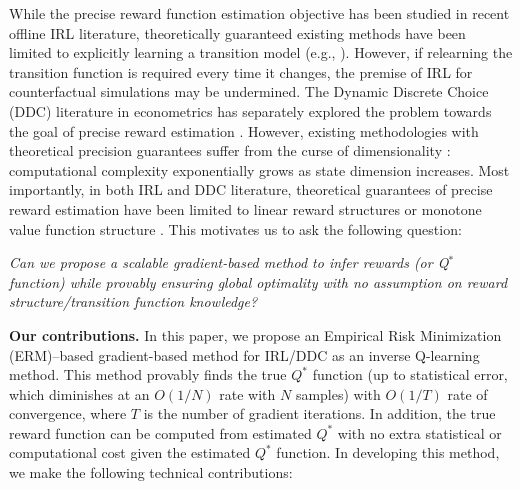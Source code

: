 While the precise reward function estimation objective has been studied in recent offline IRL literature, theoretically guaranteed existing methods have been limited to explicitly learning a transition model (e.g., \citet{zeng2023understanding}). However, if relearning the transition function is required every time it changes, the premise of IRL for counterfactual simulations may be undermined. The Dynamic Discrete Choice (DDC) literature in econometrics has separately explored the problem towards the goal of precise reward estimation \citep{rust1994structural, hotz1993conditional, aguirregabiria2007sequential, su2012constrained}. However, existing methodologies with theoretical precision guarantees suffer from the curse of dimensionality \citep{geng2023data}: computational complexity exponentially grows as state dimension increases. Most importantly, in both IRL and DDC literature, theoretical guarantees of precise reward estimation have been limited to linear reward structures \citep{zeng2023understanding} or monotone value function structure \cite{feng2020global}. This motivates us to ask the following question:
\vspace{0.2cm}
\begin{center}
    \textit{Can we propose a scalable gradient-based method to infer rewards  (or Q$^*$ function) while provably ensuring global optimality with no assumption on reward structure/transition function knowledge?}
\end{center}
\vspace{0.2cm}

\noindent \textbf{Our contributions. }In this paper, we propose an Empirical Risk Minimization (ERM)--based gradient-based method for IRL/DDC as an inverse Q-learning method. This method provably finds the true $Q^\ast$ function (up to statistical error, which diminishes at an $O(1/N)$ rate with $N$ samples) with $O(1/T)$ rate of convergence, where $T$ is the number of gradient iterations. In addition, the true reward function can be computed from estimated $Q^\ast$ with no extra statistical or computational cost given the estimated $Q^\ast$ function. In developing this method, we make the following technical contributions:

